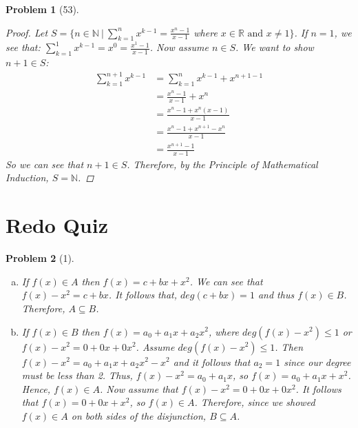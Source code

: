 \documentclass{article}
\theoremstyle{problem}
\newtheorem{prob}{Problem}
\theoremstyle{plain}
\theoremstyle{remark}
\begin{document}
\begin{prob}[53]

\begin{proof}
Let $S = \{n \in \mathbb{N}\ |\ \displaystyle \sum_{k = 1}^{n}{x^{k-1}}  = \frac{x^n - 1}{x - 1}$ where $x \in \mathbb{R}\text{ and }x \not = 1 \}$.
If $n = 1$, we see that: $\displaystyle \sum_{k = 1}^{1}{x^{k-1}}  = x^0 = \frac{x^1 - 1}{x - 1}$. Now assume $n \in S$. We want to show $n+1 \in S$:
\begin{align*}
\displaystyle \sum_{k = 1}^{n+1}{x^{k-1}}  &= \displaystyle \sum_{k = 1}^{n}{x^{k-1}} + x^{n+1-1}\\
&= \frac{x^n - 1}{x-1} + x^n\\
&= \frac{x^n - 1 + x^n(x - 1)}{x - 1}\\
&= \frac{x^n - 1 + x^{n+1} - x^n}{x - 1}\\
&= \frac{x^{n+1} - 1}{x - 1}
\end{align*}
So we can see that $n + 1 \in S$. Therefore, by the Principle of Mathematical Induction, $S = \mathbb{N}$.
\end{proof}
\end{prob}
\section*{Redo Quiz}
\begin{prob}[1]\ \\[-1cm]
  \begin{enumerate}[a)]
  \item If $f(x) \in A$ then $f(x) = c + bx + x^2$. We can see that $f(x) - x^2 = c + bx$. It follows that, $deg(c + bx) = 1$ and thus $f(x) \in B$. Therefore, $A \subseteq B$.

  \item If $f(x) \in B$ then $f(x) = a_0 + a_1x + a_2x^2$, where $deg(f(x) - x^2) \leq 1$ or $f(x) - x^2 = 0 + 0x + 0x^2$. Assume $deg(f(x) - x^2) \leq 1$. Then $f(x) - x^2 = a_0 + a_1x + a_2x^2 - x^2$ and it follows that $a_2 = 1$ since our degree must be less than 2. Thus, $f(x) - x^2 = a_0 + a_1x$, so $f(x) = a_0 + a_1x + x^2$. Hence, $f(x) \in A$. Now assume that $f(x) - x^2 = 0 + 0x + 0x^2$. It follows that $f(x) = 0 + 0x + x^2$, so $f(x) \in A$. Therefore, since we showed $f(x) \in A$ on both sides of the disjunction, $B \subseteq A$.
  \end{enumerate}
\end{prob}
\end{document}
